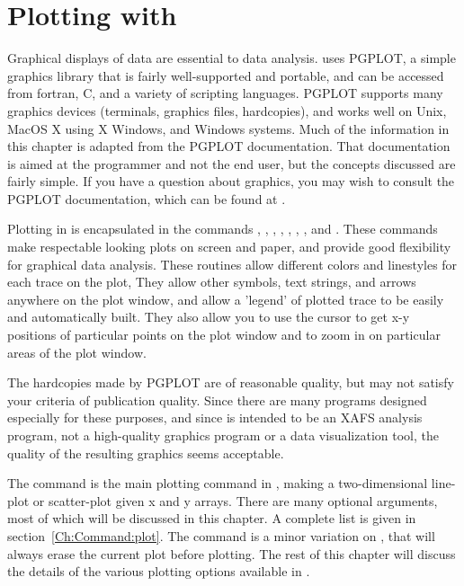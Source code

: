 \section{Plotting with {\ifeffit}} \label{Ch:Plot}

Graphical displays of data are essential to data analysis.  {\ifeffit} uses
PGPLOT, a simple graphics library that is fairly well-supported and
portable, and can be accessed from fortran, C, and a variety of scripting
languages.  PGPLOT supports many graphics devices (terminals, graphics
files, hardcopies), and works well on Unix, MacOS X using X Windows, and
Windows systems.  Much of the information in this chapter is adapted from
the PGPLOT documentation.  That documentation is aimed at the programmer
and not the end user, but the concepts discussed are fairly simple.  If you
have a question about {\ifeffit} graphics, you may wish to consult the
PGPLOT documentation, which can be found at {\WWWpgplot}.


Plotting in {\ifeffit} is encapsulated in the commands {},
{}, {}, {}, {},
{}, {}, and {}.
These commands make respectable looking plots on screen and paper, and
provide good flexibility for graphical data analysis.  These routines allow
different colors and linestyles for each trace on the plot, They allow
other symbols, text strings, and arrows anywhere on the plot window, and
allow a 'legend' of plotted trace to be easily and automatically built.
They also allow you to use the cursor to get x-y positions of particular
points on the plot window and to zoom in on particular areas of the plot
window.

The hardcopies made by PGPLOT are of reasonable quality, but may not
satisfy your criteria of publication quality.  Since there are many
programs designed especially for these purposes, and since {\ifeffit} is
intended to be an XAFS analysis program, not a high-quality graphics
program or a data visualization tool, the quality of the resulting graphics
seems acceptable.


The {} command is the main plotting command in {\ifeffit},
making a two-dimensional line-plot or scatter-plot given x and y arrays.
There are many optional arguments, most of which will be discussed in this
chapter. A complete list is given in section~{\ref{Ch:Command:plot}}.  The
{} command is a minor variation on {}, that will
always erase the current plot before plotting.  The rest of this chapter
will discuss the details of the various plotting options available in
{\ifeffit}.

